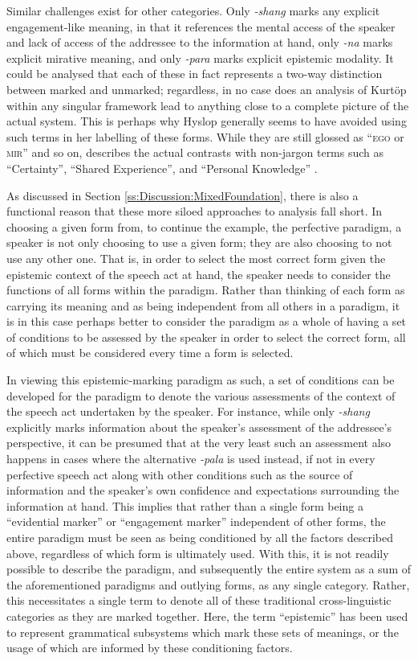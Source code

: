 Similar challenges exist for other categories. Only \textit{-shang} marks any explicit engagement-like meaning, in that it references the mental access of the speaker and lack of access of the addressee to the information at hand, only \textit{-na} marks explicit mirative meaning, and only \textit{-para} marks explicit epistemic modality. It could be analysed that each of these in fact represents a two-way distinction between marked and unmarked; regardless, in no case does an analysis of Kurtöp within any singular framework lead to anything close to a complete picture of the actual system. This is perhaps why Hyslop generally seems to have avoided using such terms in her labelling of these forms. While they are still glossed as ``\textsc{ego} or \textsc{mir}'' and so on,  describes the actual contrasts with non-jargon terms such as ``Certainty'', ``Shared Experience'', and ``Personal Knowledge'' \cite[113]{Hyslop2014}.

As discussed in Section \ref{ss:Discussion:MixedFoundation}, there is also a functional reason that these more siloed approaches to analysis fall short. In choosing a given form from, to continue the example, the perfective paradigm, a speaker is not only choosing to use a given form; they are also choosing to not use any other one. That is, in order to select the most correct form given the epistemic context of the speech act at hand, the speaker needs to consider the functions of all forms within the paradigm. Rather than thinking of each form as carrying its meaning and as being independent from all others in a paradigm, it is in this case perhaps better to consider the paradigm as a whole of having a set of conditions to be assessed by the speaker in order to select the correct form, all of which must be considered every time a form is selected.

In viewing this epistemic-marking paradigm as such, a set of conditions can be developed for the paradigm to denote the various assessments of the context of the speech act undertaken by the speaker. For instance, while only \textit{-shang} explicitly marks information about the speaker's assessment of the addressee's perspective, it can be presumed that at the very least such an assessment also happens in cases where the alternative \textit{-pala} is used instead, if not in every perfective speech act along with other conditions such as the source of information and the speaker's own confidence and expectations surrounding the information at hand. This implies that rather than a single form being a ``evidential marker'' or ``engagement marker'' independent of other forms, the entire paradigm must be seen as being conditioned by all the factors described above, regardless of which form is ultimately used. With this, it is not readily possible to describe the paradigm, and subsequently the entire system as a sum of the aforementioned paradigms and outlying forms, as any single category. Rather, this necessitates a single term to denote all of these traditional cross-linguistic categories as they are marked together. Here, the term ``epistemic'' has been used to represent grammatical subsystems which mark these sets of meanings, or the usage of which are informed by these conditioning factors.


